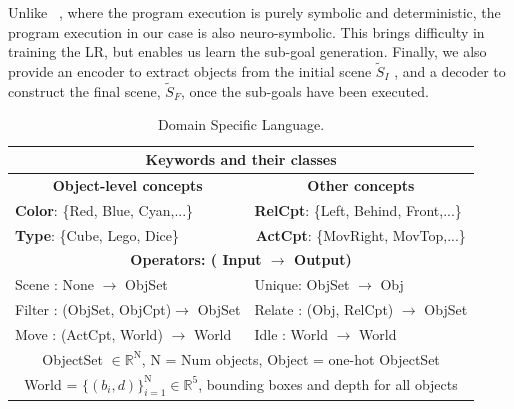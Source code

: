Unlike ~\cite{Mao2019NeuroSymbolic}, where the program execution is purely symbolic and deterministic, the program execution in our case is also neuro-symbolic. This brings difficulty in training the LR, but enables us learn the sub-goal generation. 
Finally, we also provide an encoder to extract objects from the initial scene $\tilde{S}_I$ , and a decoder to construct the final scene, $\tilde{S}_F$, once the sub-goals have been executed.


\begin{table}
    \centering
    \begin{tabular}{|p|p|p|p|}
        \hline
        \multicolumn{4}{|c|}{\textbf{Keywords and their classes}}\\
        \hline
         \multicolumn{2}{|c|}{\textbf{Object-level concepts}}& \multicolumn{2}{c|}{\textbf{Other concepts}} \\
         \multicolumn{2}{|l|}{\textbf{Color}: \{Red, Blue, Cyan,...\}}& \multicolumn{2}{l|}{\textbf{RelCpt}: \{Left, Behind, Front,...\}} \\
         \multicolumn{2}{|l|}{\textbf{Type}: \{Cube, Lego, Dice\}} & \multicolumn{2}{c|}{\textbf{ActCpt}:  \{MovRight, MovTop,...\}} \\
    \hline
    \hline
    \multicolumn{4}{|c|}{\textbf{Operators: ( Input $\rightarrow$ Output)}}\\
    \hline
    \multicolumn{2}{|l|}{Scene : None $\rightarrow$ ObjSet} & \multicolumn{2}{l|}{Unique: ObjSet $\rightarrow$ Obj}\\
     \multicolumn{2}{|l|}{Filter : (ObjSet, ObjCpt)$ \rightarrow$ ObjSet} & \multicolumn{2}{l|}{Relate  : (Obj, RelCpt) $\rightarrow$ ObjSet}\\
     \multicolumn{2}{|l|}{ Move : (ActCpt, World) $\rightarrow$ World} & \multicolumn{2}{l|}{ Idle :  World $\rightarrow$ World}\\
    \hline
    \multicolumn{4}{|c|}{ObjectSet $\in \mathbb{R}^{\text{N}}$, N = Num objects, Object = one-hot ObjectSet}\\
    \multicolumn{4}{|c|}{World = $\{(b_i,d)\}_{i=1}^\text{N} \in \mathbb{R}^5$, bounding boxes and depth for all objects }\\
    \hline
        \end{tabular}
    \caption{Domain Specific Language.}
    \label{table:dsl}
    \vspace{-0.5cm}
\end{table}

